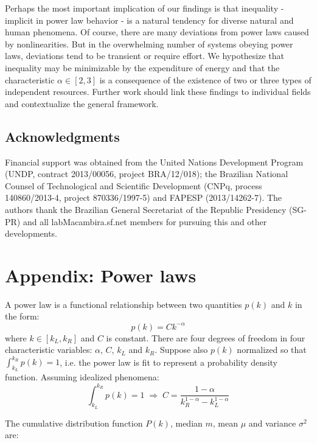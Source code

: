 \documentclass[10pt,letterpaper]{article}
\begin{document}
Perhaps the most important implication of our findings is that inequality - implicit in power law behavior - is a natural tendency for diverse natural and human phenomena. Of course, there are many deviations from power laws caused by nonlinearities. But in the overwhelming number of systems obeying power laws, deviations tend to be transient or require effort. We hypothesize that inequality may be minimizable by the expenditure of energy and that the characteristic $\alpha \in [2,3]$ is a consequence of the existence of two or three types of independent resources. Further work should link these findings to individual fields and contextualize the general framework.

\subsection*{Acknowledgments}
Financial support was obtained from the United Nations Development Program (UNDP, contract 2013/00056, project BRA/12/018);
the Brazilian National Counsel of Technological and Scientific Development (CNPq, process 140860/2013-4, project 870336/1997-5) and FAPESP (2013/14262-7).
The authors thank the Brazilian General Secretariat of the Republic Presidency (SG-PR) and all labMacambira.sf.net members for pursuing this and other developments.

\section*{Appendix: Power laws}
\renewcommand\theequation{A\arabic{equation}}
\setcounter{equation}{0}
A power law is a functional relationship between two quantities $p(k)$ and $k$ in the form:
\begin{equation}\label{eq:pow}
p(k) = Ck^{-\alpha}
\end{equation}
\noindent where $k\in [k_L,k_R]$
and $C$ is constant.
There are four degrees of freedom in four characteristic variables:
$\alpha$, $C$, $k_L$ and $k_R$.
Suppose also $p(k)$ normalized so that
$\int_{k_L}^{k_R}p(k)=1$, i.e.
the power law is fit to represent a
probability density function.
Assuming idealized phenomena:
\begin{equation}\label{eq:con}
\int_{k_L}^{k_R}p(k)=1\;\Rightarrow\;
C=\frac{1-\alpha}{k_R^{1-\alpha}-k_L^{1-\alpha}}
\end{equation}

The cumulative distribution function $P(k)$, median $m$, mean $\mu$ and variance $\sigma^2$ are:
\end{document}

